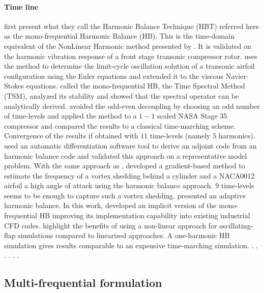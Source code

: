 \paragraph{Time line}
\citet{Hall2002} first present what they call
the Harmonic Balance Technique (HBT) referred here
as the mono-frequential Harmonic Balance (HB). This is 
the time-domain equivalent of the NonLinear Harmonic method
presented by \citet{He1998}. It is validated on 
the harmonic vibration response of a front 
stage transonic compressor rotor.
\citet{Thomas2002a} uses the method to
determine the limit-cycle oscillation solution
of a transonic airfoil configuration using the
Euler equations and \citet{Thomas2004b} extended
it to the viscous Navier-Stokes equations.
\citet{Gopinath2005} called the mono-frequential HB,
the Time Spectral Method (TSM), analyzed its stability and
showed that the spectral operator can be analytically derived.
\citet{Weide2005} avoided the odd-even decoupling by choosing 
an odd number of time-levels
and applied the method to a $1-1$ scaled NASA Stage $35$ compressor 
and
compared the results to a classical time-marching scheme.
Convergence of the results if obtained with $11$ time-levels
(namely $5$ harmonics).
\citet{Thomas2005b} used an automatic 
differentiation software tool to derive an adjoint code
from an harmonic balance code and validated this approach
on a representative model problem.
With the same approach as \citet{McMullen2002}, \citet{Gopinath2006}
developed a gradient-based method to estimate the frequency of a 
vortex shedding behind a cylinder and a NACA0012 airfoil 
a high angle of attack using the harmonic balance approach.
$9$ time-levels seems to be enough to capture such a vortex shedding.
\citet{Maple2004} presented an adaptive harmonic balance. In this work,
\citet{JSicot2008} developed an implicit
version of the mono-frequential HB improving its implementation
capability into existing industrial CFD codes.
\citet{JDufour2009} highlight the benefits of using a 
non-linear approach for oscillating-flap simulations
compared to linearized approaches. A one-harmonic HB simulation
gives results comparable to an expensive time-marching simulation.
\citet{Jackson2011} .
\citet{JSicot2012} .
\citet{Mavriplis2012} .
\citet{Thomas2013} .
\citet{JSicot2013} .
\citet{Huang2013} .

\subsection{Multi-frequential formulation}

